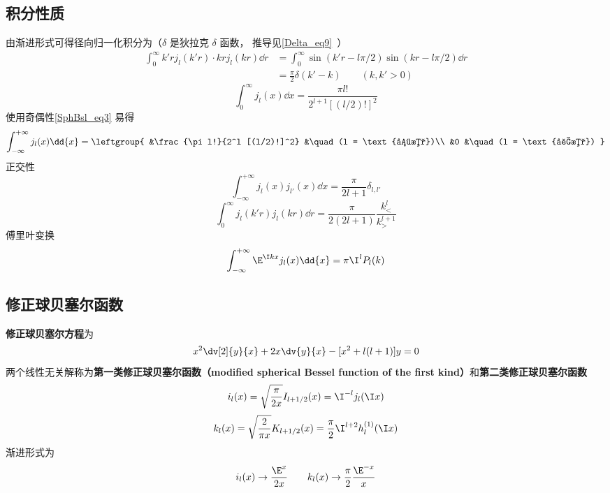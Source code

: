 \subsection{积分性质}
由渐进形式可得径向归一化积分为（$\delta$ 是狄拉克 $\delta$ 函数， 推导见\autoref{Delta_eq9}~）
\begin{equation}\label{SphBsl_eq4}
\begin{aligned}
\int_0^\infty k'r j_l(k'r) \cdot kr j_l(kr) \dd{r} &= \int_0^\infty \sin(k'r - l\pi/2)\sin(kr - l\pi/2) \dd{r}\\
& = \frac{\pi}{2}\delta(k'-k) \qquad (k, k' > 0)
\end{aligned}
\end{equation}
\begin{equation}
\int_{0}^{\infty} j_l(x) \dd{x} = \frac{\pi l!}{2^{l+1} [(l/2)!]^2}
\end{equation}
使用奇偶性\autoref{SphBsl_eq3} 易得
\begin{equation}
\int_{-\infty}^{+\infty} j_l(x) \dd{x} = \leftgroup{
&\frac{\pi l!}{2^l [(l/2)!]^2} &\quad (l = \text{偶数})\\
&0 &\quad (l = \text{奇数})
}\end{equation}
正交性
\begin{equation}
\int_{-\infty}^{+\infty} j_l(x) j_{l'}(x) \dd{x} = \frac{\pi}{2l+1}\delta_{l,l'}
\end{equation}
\begin{equation}
\int_0^\infty j_l(k' r) j_l(kr) \dd{r} = \frac{\pi}{2(2l+1)} \frac{k_<^l}{k_>^{l+1}}
\end{equation}
傅里叶变换
\begin{equation}
\int_{-\infty}^{+\infty} \E^{\I k x} j_l(x) \dd{x} = \pi \I^l P_l(k)
\end{equation}

\subsection{修正球贝塞尔函数}

\textbf{修正球贝塞尔方程}为
\begin{equation}
x^2 \dv[2]{y}{x} + 2x\dv{y}{x} - [x^2 + l(l + 1)]y = 0
\end{equation}
两个线性无关解称为\textbf{第一类修正球贝塞尔函数（modified spherical Bessel function of the first kind）}和\textbf{第二类修正球贝塞尔函数}
\begin{equation}
i_l(x) = \sqrt{\frac{\pi }{2x}} I_{l+1/2}(x) = \I^{-l} j_l(\I x)
\end{equation}
\begin{equation}\label{SphBsl_eq1}
k_l(x) = \sqrt{\frac{2}{\pi x}} K_{l+1/2}(x) = \frac{\pi }{2} \I^{l + 2} h_l^{(1)}(\I x)
\end{equation}
渐进形式为
\begin{equation}
i_l(x) \to \frac{\E^x}{2x}
\qquad
k_l(x) \to \frac{\pi}{2} \frac{\E^{-x}}{x}
\end{equation}
